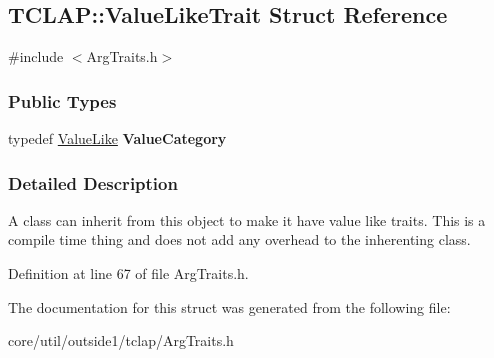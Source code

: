 \hypertarget{structTCLAP_1_1ValueLikeTrait}{}\subsection{T\+C\+L\+AP\+:\+:Value\+Like\+Trait Struct Reference}
\label{structTCLAP_1_1ValueLikeTrait}


{\ttfamily \#include $<$Arg\+Traits.\+h$>$}

\subsubsection*{Public Types}
\begin{DoxyCompactItemize}
\item 
typedef \hyperlink{structTCLAP_1_1ValueLike}{Value\+Like} {\bfseries Value\+Category}\hypertarget{structTCLAP_1_1ValueLikeTrait_aac4ee14f65926b8e741d797a8900a79a}{}\label{structTCLAP_1_1ValueLikeTrait_aac4ee14f65926b8e741d797a8900a79a}

\end{DoxyCompactItemize}


\subsubsection{Detailed Description}
A class can inherit from this object to make it have value like traits. This is a compile time thing and does not add any overhead to the inherenting class. 

Definition at line 67 of file Arg\+Traits.\+h.



The documentation for this struct was generated from the following file\+:\begin{DoxyCompactItemize}
\item 
core/util/outside1/tclap/Arg\+Traits.\+h\end{DoxyCompactItemize}

